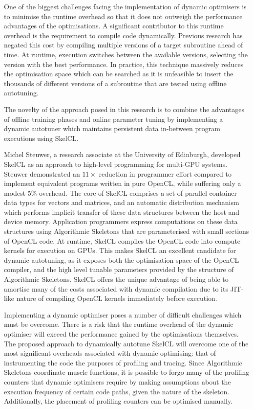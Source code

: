 One of the biggest challenges facing the implementation of dynamic
optimisers is to minimise the runtime overhead so that it does not
outweigh the performance advantages of the optimisations. A
significant contributor to this runtime overhead is the requirement to
compile code dynamically. Previous research has negated this cost by
compiling multiple versions of a target subroutine ahead of time. At
runtime, execution switches between the available versions, selecting
the version with the best performance. In practice, this technique
massively reduces the optimisation space which can be searched as it
is unfeasible to insert the thousands of different versions of a
subroutine that are tested using offline autotuning.

The novelty of the approach posed in this research is to combine the
advantages of offline training phases and online parameter tuning by
implementing a dynamic autotuner which maintains persistent data
in-between program executions using SkelCL.

Michel Steuwer, a research associate at the University of Edinburgh,
developed SkelCL as an approach to high-level programming for
multi-GPU systems. Steuwer demonstrated an $11\times$ reduction in
programmer effort compared to implement equivalent programs written in
pure OpenCL, while suffering only a modest 5\% overhead. The core of
SkelCL comprises a set of parallel container data types for vectors
and matrices, and an automatic distribution mechanism which performs
implicit transfer of these data structures between the host and device
memory. Application programmers express computations on these data
structures using Algorithmic Skeletons that are parameterised with
small sections of OpenCL code. At runtime, SkelCL compiles the OpenCL
code into compute kernels for execution on GPUs. This makes SkelCL an
excellent candidate for dynamic autotuning, as it exposes both the
optimisation space of the OpenCL compiler, and the high level tunable
parameters provided by the structure of Algorithmic Skeletons. SkelCL
offers the unique advantage of being able to amortise many of the
costs associated with dynamic compilation due to its JIT-like nature
of compiling OpenCL kernels immediately before execution.

Implementing a dynamic optimiser poses a number of difficult
challenges which must be overcome.
There is a risk that the runtime overhead of the dynamic optimiser
will exceed the performance gained by the optimisations
themselves. The proposed approach to dynamically autotune SkelCL will
overcome one of the most significant overheads associated with dynamic
optimising: that of instrumenting the code the purposes of profiling
and tracing. Since Algorithmic Skeletons coordinate muscle functions,
it is possible to forgo many of the profiling counters that dynamic
optimisers require by making assumptions about the execution frequency
of certain code paths, given the nature of the skeleton. Additionally,
the placement of profiling counters can be optimised manually.


